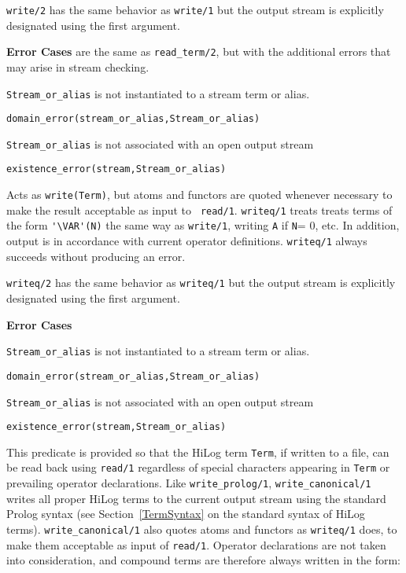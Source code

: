 \begin{description}
	{\tt write/2} has the same behavior as {\tt write/1} but the
	output stream is explicitly designated using the first argument.

{\bf Error Cases} are the same as {\tt read\_term/2}, but with the
additional errors that may arise in stream checking.
\bi
\item 	{\tt Stream\_or\_alias} is not instantiated to a stream term or alias.
\bi
\item 	{\tt domain\_error(stream\_or\_alias,Stream\_or\_alias)}
\ei
\item 	{\tt Stream\_or\_alias} is not associated with an open output stream
\bi
\item 	{\tt existence\_error(stream,Stream\_or\_alias)}
\ei
\ei

    Acts as {\tt write(Term)}, but atoms and functors are quoted
    whenever necessary to make the result acceptable as input to {\tt
    read/1}\@. {\tt writeq/1} treats treats terms of the form
    \verb|'\VAR'(N)| the same way as {\tt write/1}, writing {\tt A} if
    {\tt N}= 0, etc. In addition, output is in accordance with current
    operator definitions.  {\tt writeq/1} always succeeds without
    producing an error.

	{\tt writeq/2} has the same behavior as {\tt writeq/1} but the
	output stream is explicitly designated using the first argument.

{\bf Error Cases} 
\bi
\item 	{\tt Stream\_or\_alias} is not instantiated to a stream term or alias.
\bi
\item 	{\tt domain\_error(stream\_or\_alias,Stream\_or\_alias)}
\ei
\item 	{\tt Stream\_or\_alias} is not associated with an open output stream
\bi
\item 	{\tt existence\_error(stream,Stream\_or\_alias)}
\ei
\ei

    This predicate is provided so that the HiLog term {\tt Term}, 
    if written to a file, can be read back using {\tt read/1} regardless of 
    special characters appearing in {\tt Term} or prevailing operator 
    declarations. Like {\tt write\_prolog/1}, {\tt write\_canonical/1} 
    writes all proper HiLog terms to the current output stream using the 
    standard Prolog syntax (see Section~\ref{TermSyntax} on the standard 
    syntax of HiLog terms). {\tt write\_canonical/1} also quotes atoms and 
    functors as {\tt writeq/1} does, to make them acceptable as input of 
    {\tt read/1}\@.  Operator declarations are not taken into consideration,
    and compound terms are therefore always written in the form:


\end{description}
